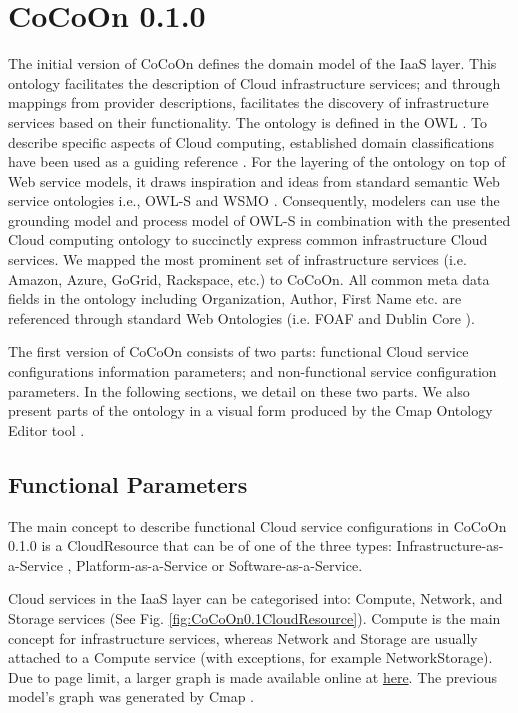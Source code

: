 \section{CoCoOn 0.1.0}
\label{sec:cocoon0.1}
The initial version of CoCoOn defines the
domain model of the IaaS layer. This ontology facilitates the
description of Cloud infrastructure services; and through
mappings from provider descriptions, facilitates the
discovery of infrastructure services based on their
functionality.
The ontology is defined in the OWL \cite{OWL}.
To describe specific aspects of
Cloud computing, established domain classifications have
been used as a guiding reference
\cite{UnifiedOntologyCloudComputing}.
For the layering of the ontology on top of Web service models,
it draws inspiration and ideas from standard semantic Web service ontologies i.e.,
OWL-S \cite{BringingSemanticsToWebServicesOWL-S}
and WSMO \cite{WSMO}. Consequently, modelers can use the
grounding model and process model of OWL-S in
combination with the presented Cloud computing ontology
to succinctly express common infrastructure Cloud services.
We mapped the most prominent set of infrastructure services
(i.e. Amazon, Azure, GoGrid, Rackspace, etc.) to CoCoOn.
All common meta data fields in the ontology including
Organization, Author, First Name etc. are referenced through
standard Web Ontologies (i.e. FOAF \cite{FOAF} and
Dublin Core \cite{DublinCore}).

The first version of CoCoOn consists of two parts:
functional Cloud service configurations information
parameters; and non-functional service configuration
parameters. In the following sections, we detail on these two
parts. We also present parts of the ontology in a visual form
produced by the Cmap Ontology Editor tool \cite{CmapToolsOntologyEditor}.

\subsection{Functional Parameters}
The main concept to describe functional Cloud service
configurations in CoCoOn 0.1.0 is a CloudResource that can be of
one of the three types: Infrastructure-as-a-Service ,
Platform-as-a-Service or Software-as-a-Service.

Cloud services in the IaaS layer can be categorised into:
Compute, Network, and Storage services
(See Fig. \ref{fig:CoCoOn0.1CloudResource}).
Compute is the main concept for infrastructure services,
whereas Network and Storage are usually attached to a
Compute service (with exceptions, for example
NetworkStorage).
Due to page limit, a larger graph is made available online at
\href{https://cmapscloud.ihmc.us/viewer/cmap/1SB4SYXQ2-1NW70FR-1MMSKJ}{here}.
The previous model's graph was generated by Cmap \cite{cmap}. 

